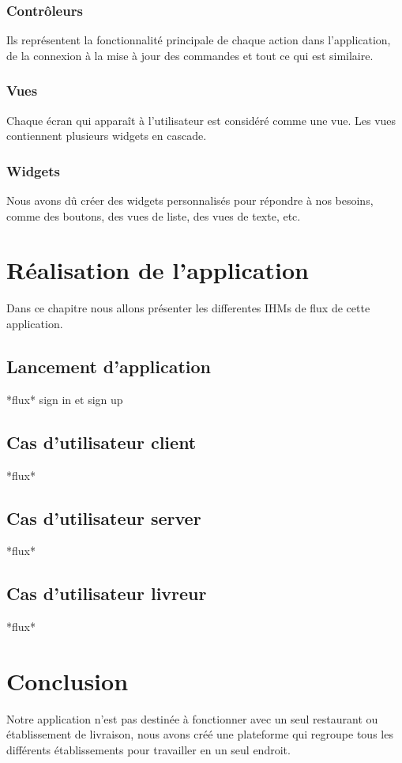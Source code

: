 \documentclass[french, a4paper, 12pt]{report}
\begin{document}
		\subsection{Contrôleurs} Ils représentent la fonctionnalité principale de chaque action dans l'application, de la connexion à la mise à jour des commandes et tout ce qui est similaire.
		\subsection{Vues} Chaque écran qui apparaît à l'utilisateur est considéré comme une vue. Les vues contiennent plusieurs widgets en cascade.
		\subsection{Widgets} Nous avons dû créer des widgets personnalisés pour répondre à nos besoins, comme des boutons, des vues de liste, des vues de texte, etc.
		
\newpage
\chapter{Réalisation de l'application} Dans ce chapitre nous allons présenter les differentes IHMs de flux de cette application.
	\section{Lancement d'application} *flux* sign in et sign up
	\section{Cas d'utilisateur client} *flux*
	\section{Cas d'utilisateur server} *flux*
	\section{Cas d'utilisateur livreur} *flux*

\newpage
\chapter*{Conclusion}
Notre application n'est pas destinée à fonctionner avec un seul restaurant ou établissement de livraison, nous avons créé une plateforme qui regroupe tous les différents établissements pour travailler en un seul endroit.\\
\end{document}
